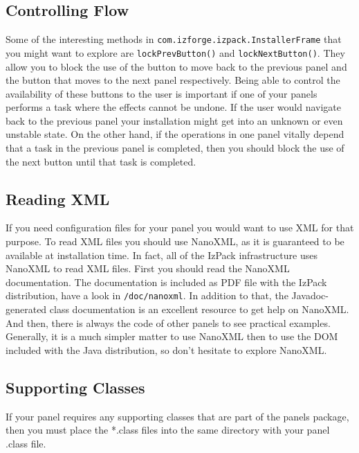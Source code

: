 \subsection{Controlling Flow}

Some of the interesting methods in
\texttt{com.izforge.izpack.InstallerFrame} that you might want to explore
are \texttt{lockPrevButton()} and \texttt{lockNextButton()}.  They allow
you to block the use of the button to move back to the previous panel
and the button that moves to the next panel respectively.  Being able to
control the availability of these buttons to the user is important if
one of your panels performs a task where the effects cannot be undone.  If
the user would navigate back to the previous panel your installation might
get into an unknown or even unstable state.  On the other hand, if the
operations in one panel vitally depend that a task in the previous panel
is completed, then you should block the use of the next button until that
task is completed.\\

\subsection{Reading XML}

If you need configuration files for your panel you would want to use XML
for that purpose.  To read XML files you should use NanoXML, as it is
guaranteed to be available at installation time.  In fact, all of the
IzPack infrastructure uses NanoXML to read XML files.  First you should
read the NanoXML documentation.  The documentation is included as PDF file
with the IzPack distribution, have a look in \texttt{/doc/nanoxml}.  In
addition to that, the Javadoc-generated class documentation is an
excellent resource to get help on NanoXML.  And then, there is always the
code of other panels to see practical examples.  Generally, it is a much
simpler matter to use NanoXML then to use the DOM included with the Java
distribution, so don't hesitate to explore NanoXML.

\subsection{Supporting Classes}

If your panel requires any supporting classes that are part of the panels
package, then you must place the *.class files into the same directory
with your panel .class file.\\

